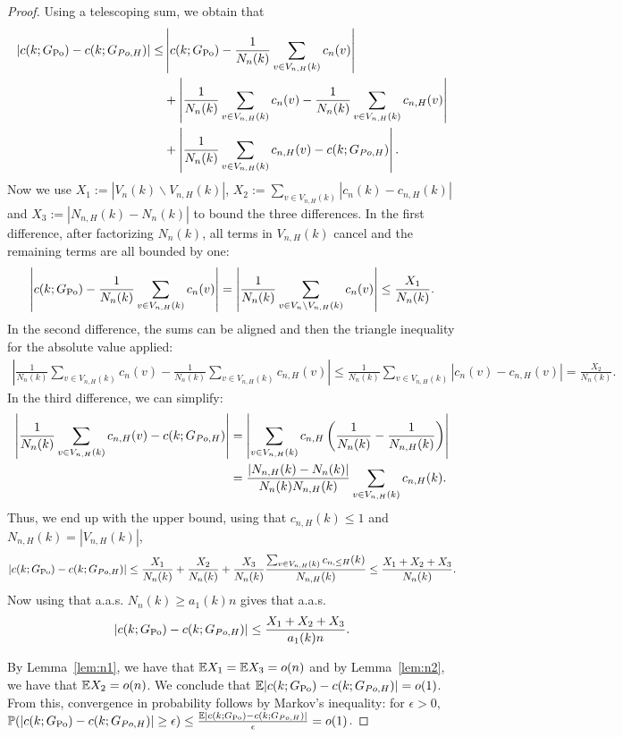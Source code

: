 \begin{proof}
Using a telescoping sum, we obtain that
\begin{align*}
|c(k;G_{\text{Po}})-c(k;G_{Po,H})| \leq & \left|c(k;G_{\text{Po}})-\frac{1}{N_n(k)}\sum_{v \in V_{n,H}(k)} c_n(v)\right|\\
&+\left|\frac{1}{N_n(k)}\sum_{v \in V_{n,H}(k)} c_n(v) -\frac{1}{N_n(k)}\sum_{v \in V_{n,H}(k)}c_{n,H}(v)\right| \\
&+\left|\frac{1}{N_n(k)}\sum_{v \in V_{n,H}(k)} c_{n, H}(v)-c(k;G_{Po,H})\right|. 
\end{align*}
Now we use $X_1 := |V_n(k)\backslash V_{n,H}(k)|$, $X_2 := \sum_{v \in V_{n,H}(k)}|c_n(k)-c_{n,H}(k)|$ and $X_3 :=|N_{n,H}(k)-N_n(k)|$ to bound the three differences. In the first difference, after factorizing $N_n(k)$, all terms in $V_{n,H}(k)$ cancel and the remaining terms are all bounded by one:
\begin{align*}
\left|c(k;G_{\text{Po}})-\frac{1}{N_n(k)}\sum_{v \in V_{n,H}(k)} c_n(v)\right| = \left| \frac{1}{N_n(k)}\sum_{v \in V_n \backslash V_{n,H}(k)} c_n(v) \right| \leq \frac{X_1}{N_n(k)}.
\end{align*}
In the second difference, the sums can be aligned and then the triangle inequality for the absolute value applied:
\begin{align*}
\left|\frac{1}{N_n(k)}\sum_{v \in V_{n,H}(k)} c_n(v) -\frac{1}{N_n(k)}\sum_{v \in V_{n,H}(k)}c_{n,H}(v)\right| \leq \frac{1}{N_n(k)}\sum_{v \in V_{n,H}(k)} \left|c_n(v)-c_{n,H}(v)\right| =\frac{X_2}{N_n(k)}.
\end{align*}
In the third difference, we can simplify:
\begin{align*}
\left|\frac{1}{N_n(k)}\sum_{v \in V_{n,H}(k)} c_{n, H}(v)-c(k;G_{Po,H})\right| &= \left|\sum_{v\in V_{n,H}(k)} c_{n,H} \left(\frac{1}{N_n(k)}-\frac{1}{N_{n,H}(k)}\right)\right| \\
&= \frac{|N_{n,H}(k)-N_n(k)|}{N_n(k)N_{n,H}(k)}\sum_{v \in V_{n,H}(k)}c_{n,H}(k).
\end{align*}
Thus, we end up with the upper bound, using that $c_{n,H}(k) \leq 1$ and $N_{n,H}(k) = |V_{n,H}(k)|$,
\begin{align*}
|c(k;G_{\text{Po}})-c(k;G_{Po,H})| \leq \frac{X_1}{N_n(k)}+\frac{X_2}{N_n(k)}+\frac{X_3}{N_n(k)}\frac{\sum_{v \in V_{n,H}(k)}c_{n,\leq H}(k)}{N_{n,H}(k)} \leq \frac{X_1+X_2+X_3}{N_n(k)}.
\end{align*}
Now using that a.a.s. $N_n(k) \geq a_1(k)n$ gives that a.a.s.
\begin{align*}
|c(k;G_{\text{Po}})-c(k;G_{Po,H})| \leq \frac{X_1+X_2+X_3}{a_1(k)n}.
\end{align*}

By Lemma~\ref{lem:n1}, we have that $\mathbb{E} X_1 = \mathbb{E} X_3 = o(n)$ and by Lemma~\ref{lem:n2}, we have that $\mathbb{E} X_2 = o(n)$. We conclude that $\mathbb{E} |c(k;G_{\text{Po}})-c(k;G_{Po,H})| = o(1)$. From this, convergence in probability follows by Markov's inequality: for $\epsilon >0$, $\mathbb{P}(|c(k;G_{\text{Po}})-c(k;G_{Po,H})| \geq \epsilon) \leq \frac{\mathbb{E}|c(k;G_{\text{Po}})-c(k;G_{Po,H})|}{\epsilon} = o(1)$.
\end{proof}
